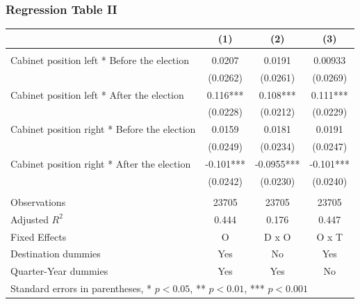 \documentclass[compress, xcolor = {table,xcdraw}]{beamer}
\begin{document}
\begin{frame}
\frametitle{Regression Table II}
\begin{table}
\centering
\tiny
\begin{tabular}{l*{3}{c}}
	\hline\hline
	&\multicolumn{1}{c}{(1)}         &\multicolumn{1}{c}{(2)}         &\multicolumn{1}{c}{(3)}         \\
	\hline
	& \\
	Cabinet position left * Before the election&      0.0207         &      0.0191         &     0.00933         \\
	&    (0.0262)         &    (0.0261)         &    (0.0269)         \\
	[0.7em]
	Cabinet position left * After the election&       0.116***&       0.108***&       0.111***\\
	&    (0.0228)         &    (0.0212)         &    (0.0229)         \\
	[0.7em]
	Cabinet position right * Before the election&      0.0159         &      0.0181         &      0.0191         \\
	&    (0.0249)         &    (0.0234)         &    (0.0247)         \\
	[0.7em]
	Cabinet position right * After the election&      -0.101***&     -0.0955***&      -0.101***\\
	&    (0.0242)         &    (0.0230)         &    (0.0240)         \\
	& \\
	\hline
	Observations        &       23705         &       23705         &       23705         \\
	Adjusted \(R^{2}\)  &       0.444         &       0.176         &       0.447         \\
	Fixed Effects       &           O         &       D x O         &       O x T         \\
	Destination dummies &         Yes         &          No         &         Yes         \\
	Quarter-Year dummies&         Yes         &         Yes         &          No         \\
	\hline\hline
	\multicolumn{4}{l}{\tiny Standard errors in parentheses, * \(p<0.05\), ** \(p<0.01\), *** \(p<0.001\)}\\
\end{tabular}
\end{table}
\end{frame}
\end{document}
